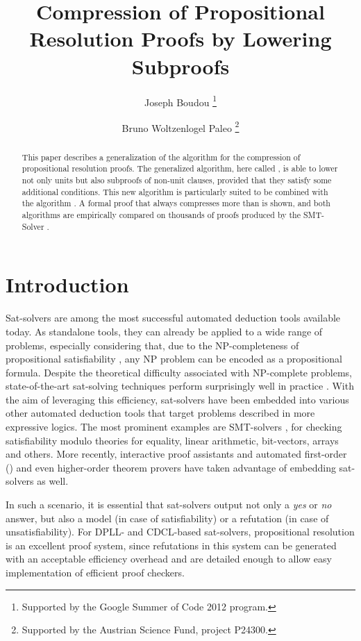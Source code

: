\documentclass{llncs}
\title{Compression of Propositional Resolution Proofs by Lowering Subproofs}
\author{
  Joseph Boudou\inst{1}
  \thanks{Supported by the Google Summer of Code 2012 program.}
  \and 
  Bruno Woltzenlogel Paleo\inst{2}
  \thanks{Supported by the Austrian Science Fund, project P24300.}
}
\institute{
  Universit\'e Paul Sabatier, Toulouse \\
  \email{joseph.boudou@matabio.net}
  \and 
  Vienna University of Technology \\
  \email{bruno@logic.at}
}
\begin{document}
\maketitle


\begin{abstract}
This paper describes a generalization of the {\LowerUnits} algorithm \cite{LURPI} for the
compression of propositional resolution proofs.  The generalized algorithm, here called
{\LowerUnivalents}, is able to lower not only units but also subproofs of non-unit clauses, provided
that they satisfy some additional conditions.  This new algorithm is particularly suited to be
combined with the {\RecyclePivotsIntersection} algorithm \cite{LURPI}.  A formal proof that
{\LowerUnivalents} always compresses more than {\LowerUnits} is shown, and both algorithms are
empirically compared on thousands of proofs produced by the SMT-Solver \veriT.
\end{abstract}

\setcounter{footnote}{0}

\section{Introduction}

Sat-solvers are among the most successful automated deduction tools available today. As standalone
tools, they can already be applied to a wide range of problems, especially considering that, due to
the NP-completeness of propositional satisfiability \cite{cook}, any NP problem can be encoded as a
propositional formula. Despite the theoretical difficulty associated with NP-complete
problems, state-of-the-art sat-solving techniques perform surprisingly well in practice
\cite{sat-competition}. With the aim of leveraging this efficiency, sat-solvers have been embedded
into various other automated deduction tools that target problems described in more expressive
logics. The most prominent examples are SMT-solvers \cite{veriT}, for checking satisfiability modulo
theories for equality, linear arithmetic, bit-vectors, arrays and others. More recently,
interactive proof assistants \cite{isabelle-blanchette-boehme} and automated first-order
(\cite{iProver}) and even higher-order \cite{satallax} theorem provers have
taken advantage of embedding sat-solvers as well.

In such a scenario, it is essential that sat-solvers output not only a \emph{yes} or \emph{no}
answer, but also a model (in case of satisfiability) or a refutation (in case of unsatisfiability).
For DPLL- and CDCL-based sat-solvers, propositional resolution is an excellent proof system, since
refutations in this system can be generated with an acceptable efficiency overhead and are detailed
enough to allow easy implementation of efficient proof checkers.
\end{document}
